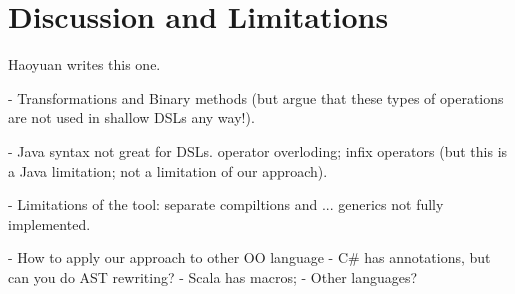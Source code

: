 \section{Discussion and Limitations}

Haoyuan writes this one.

- Transformations and Binary methods (but argue that 
these types of operations are not used in shallow DSLs 
any way!).

- Java syntax not great for DSLs. 
operator overloding; infix operators (but this is a Java limitation; 
not a limitation of our approach).

- Limitations of the tool: separate compiltions and ... 
generics not fully implemented.

- How to apply our approach to other OO language 
  - C\# has annotations, but can you do AST rewriting?
  - Scala has macros;
  - Other languages? 
